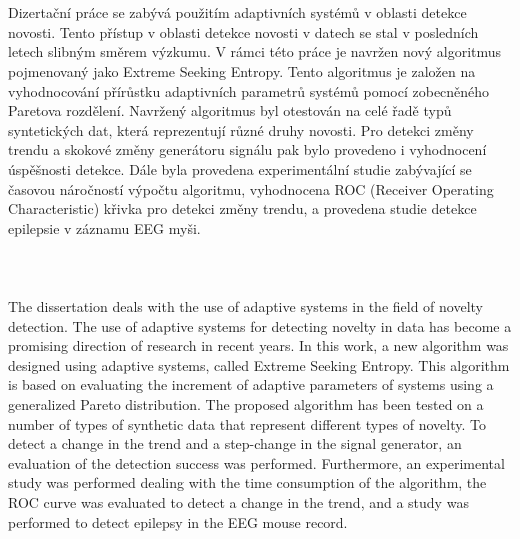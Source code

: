 \cleardoublepage
\thispagestyle{empty}\

\newpage
 




\clearpage
\thispagestyle{empty}

 \\ [5mm]
Dizertační práce se zabývá použitím adaptivních systémů v oblasti detekce novosti. Tento přístup v oblasti detekce novosti v datech se stal v posledních letech slibným směrem výzkumu. V rámci této práce je navržen nový algoritmus pojmenovaný jako Extreme Seeking Entropy. Tento algoritmus je založen na vyhodnocování přírůstku adaptivních parametrů systémů pomocí zobecněného Paretova rozdělení. Navržený algoritmus byl otestován na celé řadě typů syntetických dat, která reprezentují různé druhy novosti. Pro detekci změny trendu a skokové změny generátoru signálu pak bylo provedeno i vyhodnocení úspěšnosti detekce. Dále byla provedena experimentální studie zabývající se časovou náročností výpočtu algoritmu, vyhodnocena ROC (Receiver Operating Characteristic) křivka pro detekci změny trendu, a provedena studie detekce epilepsie v záznamu EEG myši.\\ [5mm]
  \\ [5mm]  \\ [5mm]

 \\ [5mm] 
The dissertation deals with the use of adaptive systems in the field of novelty detection. The use of adaptive systems for detecting novelty in data has become a promising direction of research in recent years. In this work, a new algorithm was designed using adaptive systems, called Extreme Seeking Entropy. This algorithm is based on evaluating the increment of adaptive parameters of systems using a generalized Pareto distribution. The proposed algorithm has been tested on a number of types of synthetic data that represent different types of novelty. To detect a change in the trend and a step-change in the signal generator, an evaluation of the detection success was performed. Furthermore, an experimental study was performed dealing with the time consumption of the algorithm, the ROC curve was evaluated to detect a change in the trend, and a study was performed to detect epilepsy in the EEG mouse record.
\\ [5mm]



